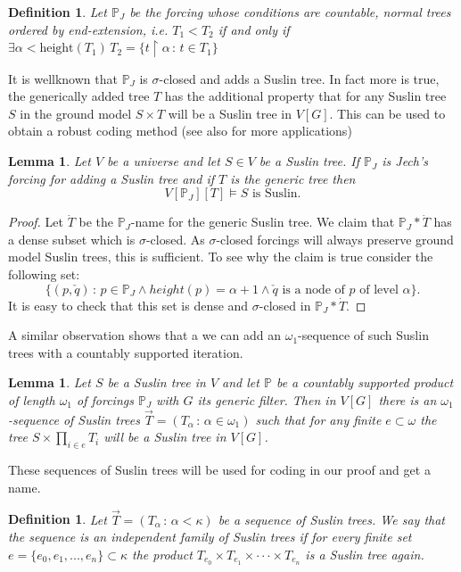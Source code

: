 \documentclass[a4paper,12pt]{article}
\newtheorem{lemma}[theorem]{Lemma}
\newtheorem{definition}[theorem]{Definition}
\newcommand{\forceP}{\mathbb{P}}
\begin{document}
\begin{definition}
 Let $\forceP_J$ be the forcing whose conditions are
 countable, normal trees ordered by end-extension, i.e. $T_1 < T_2$ if and only
 if $\exists \alpha < \text{height}(T_1) \, T_2= \{ t \upharpoonright \alpha \, : \, t \in T_1 \}$
\end{definition}
It is wellknown that $\forceP_J$ is $\sigma$-closed and
adds a Suslin tree. In fact more is true, the generically added tree $T$ has 
the additional property that for any Suslin tree $S$ in the ground model
$S \times T$ will be a Suslin tree in $V[G]$. This can be used to obtain a robust coding method (see also \cite{Ho} for more applications)
\begin{lemma}
 Let $V$ be a universe and let $S \in V$ be a Suslin tree. If $\forceP_J$ is 
 Jech's forcing for adding a Suslin tree and if $T$ is the generic tree
 then $$V[\forceP_{J}][T] \models  S \text{ is Suslin.}$$
\end{lemma}

\begin{proof}
Let $\dot{T}$ be the $\forceP_J$-name for the generic Suslin tree. We claim that $\forceP_J \ast \dot{T}$ has a dense subset which is $\sigma$-closed. As $\sigma$-closed forcings will always preserve ground model Suslin trees, this is sufficient. To see why the claim is true consider the following set:
$$\{ (p, \check{q}) \, : \, p \in \forceP_J \land height(p)= \alpha+1  \land  \check{q} \text{ is a node of $p$ of level } \alpha \}.$$
It is easy to check that this set is dense and $\sigma$-closed in $\forceP_J \ast \dot{T}$.

\end{proof}


A similar observation shows that a we can add an $\omega_1$-sequence of
such Suslin trees with a countably supported iteration. 


\begin{lemma}\label{ManySuslinTrees}
 Let $S$ be a Suslin tree in $V$ and let $\forceP$ be a countably supported
 product of length $\omega_1$ of forcings $\forceP_J$ with $G$ its generic filter. Then in
 $V[G]$ there is an $\omega_1$-sequence of Suslin trees $\vec{T}=(T_{\alpha} \, : \, \alpha \in \omega_1)$ such
that for any finite $e \subset \omega$
the tree $S \times \prod_{i \in e} T_i$ will be a Suslin tree in $V[G]$.
\end{lemma}

These sequences of Suslin trees will be used for coding in our proof and get a name.
\begin{definition}
 Let $\vec{T} = (T_{\alpha} \, : \, \alpha < \kappa)$ be a sequence of Suslin trees. We say that the sequence is an 
 independent family of Suslin trees if for every finite set $e= \{e_0, e_1,...,e_n\} \subset \kappa$ the product $T_{e_0} \times T_{e_1} \times \cdot \cdot \cdot \times T_{e_n}$ 
 is a Suslin tree again.
\end{definition}
\end{document}
